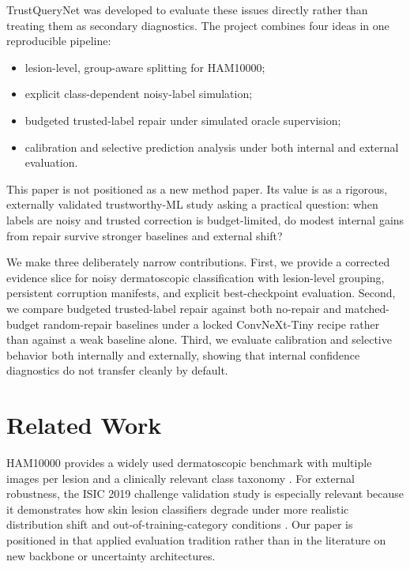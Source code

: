 \documentclass[11pt]{article}
\begin{document}
TrustQueryNet was developed to evaluate these issues directly rather than treating them as secondary diagnostics. The project combines four ideas in one reproducible pipeline:

\begin{itemize}
  \item lesion-level, group-aware splitting for HAM10000;
  \item explicit class-dependent noisy-label simulation;
  \item budgeted trusted-label repair under simulated oracle supervision;
  \item calibration and selective prediction analysis under both internal and external evaluation.
\end{itemize}

This paper is not positioned as a new method paper. Its value is as a rigorous, externally validated trustworthy-ML study asking a practical question: when labels are noisy and trusted correction is budget-limited, do modest internal gains from repair survive stronger baselines and external shift?

We make three deliberately narrow contributions. First, we provide a corrected evidence slice for noisy dermatoscopic classification with lesion-level grouping, persistent corruption manifests, and explicit best-checkpoint evaluation. Second, we compare budgeted trusted-label repair against both no-repair and matched-budget random-repair baselines under a locked ConvNeXt-Tiny recipe rather than against a weak baseline alone. Third, we evaluate calibration and selective behavior both internally and externally, showing that internal confidence diagnostics do not transfer cleanly by default.

\section{Related Work}

HAM10000 provides a widely used dermatoscopic benchmark with multiple images per lesion and a clinically relevant class taxonomy \citep{tschandl2018ham10000}. For external robustness, the ISIC 2019 challenge validation study is especially relevant because it demonstrates how skin lesion classifiers degrade under more realistic distribution shift and out-of-training-category conditions \citep{combalia2022isic2019}. Our paper is positioned in that applied evaluation tradition rather than in the literature on new backbone or uncertainty architectures.
\end{document}
